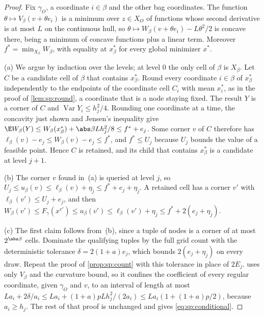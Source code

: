 \begin{proof}
Fix $\gamma_O$, a coordinate $i\in\beta$ and the other bag coordinates. The
function $\theta\mapsto V_\beta(v+\theta e_i)$ is a minimum over $z\in X_O$
of functions whose second derivative is at most $L$ on the continuous hull,
so $\theta\mapsto W_\beta(v+\theta e_i)-L\theta^2/2$ is concave there, being a
minimum of concave functions plus a linear term. Moreover
$f^*=\min_{X_\beta}W_\beta$, with equality at $x^*_\beta$ for every global
minimizer $x^*$.

(a) We argue by induction over the levels; at level $0$ the only cell of
$\beta$ is $X_\beta$. Let $C$ be a candidate cell of $\beta$ that contains
$x^*_\beta$. Round every coordinate $i\in\beta$ of $x^*_\beta$ independently
to the endpoints of the coordinate cell $C_i$ with mean $x^*_i$, as in the
proof of \cref{lem:sp:round}, a coordinate that is a node staying fixed. The
result $Y$ is a corner of $C$ and $\operatorname{Var}Y_i\le h_j^2/4$.
Rounding one coordinate at a time, the concavity just shown and Jensen's
inequality give
$\E W_\beta(Y)\le W_\beta(x^*_\beta)+\abs\beta Lh_j^2/8\le f^*+e_j$. Some
corner $v$ of $C$ therefore has $\ell_\beta(v)-e_j\le W_\beta(v)-e_j\le f^*$,
and $f^*\le U_j$ because $U_j$ bounds the value of a feasible point. Hence
$C$ is retained, and its child that contains $x^*_\beta$ is a candidate at
level $j+1$.

(b) The corner $v$ found in~(a) is queried at level $j$, so
$U_j\le u_\beta(v)\le\ell_\beta(v)+\eta_j\le f^*+e_j+\eta_j$. A retained cell has
a corner $v'$ with $\ell_\beta(v')\le U_j+e_j$, and then
$W_\beta(v')\le F_\gamma(x^{v'})\le u_\beta(v')
\le\ell_\beta(v')+\eta_j\le f^*+2(e_j+\eta_j)$.

(c) The first claim follows from~(b), since a tuple of nodes is a corner of
at most $2^{\abs\beta}$ cells. Dominate the qualifying tuples by the full
grid count with the deterministic tolerance $\delta=2(1+a)e_j$, which
bounds $2(e_j+\eta_j)$ on every draw. Repeat the proof of
\cref{prop:sp:count} with this tolerance in place of $2E_j$.
 uses only $V_\beta$ and the
curvature bound, so it confines the coefficient of every regular coordinate,
given $\gamma_O$ and $v$, to an interval of length at most
$La_i+2\delta/a_i\le La_i+(1+a)pLh_j^2/(2a_i)\le La_i(1+(1+a)p/2)$, because
$a_i\ge h_j$. The rest of that proof is unchanged and gives
\eqref{eq:sp:conditional}.
\end{proof}

